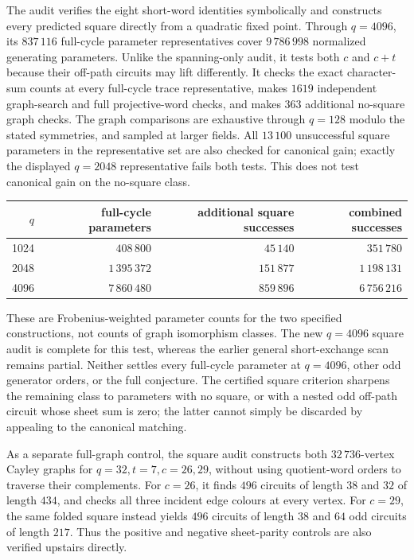 \documentclass[11pt,a4paper]{article}
\theoremstyle{definition}
\theoremstyle{remark}
\begin{document}
The audit  verifies the eight short-word identities symbolically and constructs every predicted square directly from a quadratic fixed point.  Through $q=4096$, its $837\,116$ full-cycle parameter representatives cover $9\,786\,998$ normalized generating parameters.  Unlike the spanning-only audit, it tests both $c$ and $c+t$ because their off-path circuits may lift differently.  It checks the exact character-sum counts at every full-cycle trace representative, makes $1619$ independent graph-search and full projective-word checks, and makes $363$ additional no-square graph checks.  The graph comparisons are exhaustive through $q=128$ modulo the stated symmetries, and sampled at larger fields.  All $13\,100$ unsuccessful square parameters in the representative set are also checked for canonical gain; exactly the displayed $q=2048$ representative fails both tests.  This does not test canonical gain on the no-square class.
\begin{center}
\begin{tabular}{rrrr}
\toprule
$q$ & full-cycle parameters & additional square successes & combined successes\\
\midrule
1024 & $408\,800$ & $45\,140$ & $351\,780$\\
2048 & $1\,395\,372$ & $151\,877$ & $1\,198\,131$\\
4096 & $7\,860\,480$ & $859\,896$ & $6\,756\,216$\\
\bottomrule
\end{tabular}
\end{center}
These are Frobenius-weighted parameter counts for the two specified constructions, not counts of graph isomorphism classes.  The new $q=4096$ square audit is complete for this test, whereas the earlier general short-exchange scan remains partial.  Neither settles every full-cycle parameter at $q=4096$, other odd generator orders, or the full conjecture.  The certified square criterion sharpens the remaining class to parameters with no square, or with a nested odd off-path circuit whose sheet sum is zero; the latter cannot simply be discarded by appealing to the canonical matching.

As a separate full-graph control, the square audit constructs both $32\,736$-vertex Cayley graphs for $q=32,t=7,c=26,29$, without using quotient-word orders to traverse their complements.  For $c=26$, it finds $496$ circuits of length $38$ and $32$ of length $434$, and checks all three incident edge colours at every vertex.  For $c=29$, the same folded square instead yields $496$ circuits of length $38$ and $64$ odd circuits of length $217$.  Thus the positive and negative sheet-parity controls are also verified upstairs directly.
\end{document}
